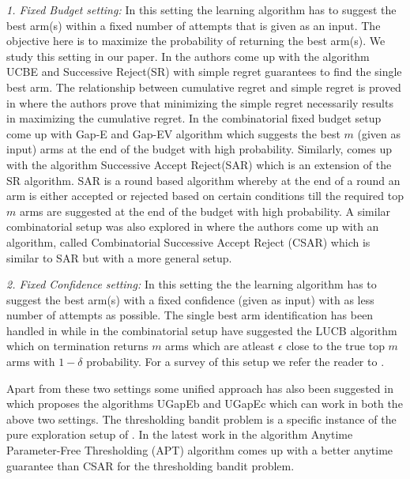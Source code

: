 	\emph{1. Fixed Budget setting:} In this setting the learning algorithm has to suggest the best arm(s) within a fixed number of attempts that is given as an input. The objective here is to maximize the probability of returning the best arm(s).  We study this setting in our paper. In \cite{audibert2010best} the authors come up with the algorithm UCBE and Successive Reject(SR) with simple regret guarantees to find the single best arm. The relationship between cumulative regret and simple regret is proved in \cite{bubeck2011pure} where the authors prove that minimizing the simple regret necessarily results in maximizing the cumulative regret. In the combinatorial fixed budget setup \cite{gabillon2011multi} come up with Gap-E and Gap-EV algorithm which suggests the best $m$ (given as input) arms at the end of the budget with high probability. Similarly, \cite{bubeck2013multiple} comes up with the algorithm Successive Accept Reject(SAR) which is an extension of the SR algorithm. SAR is a round based algorithm whereby at the end of a round an arm is either accepted or rejected based on certain conditions till the required top $m$ arms are suggested at the end of the budget with high probability. A similar combinatorial setup was also explored in \cite{chen2014combinatorial} where the authors come up with an algorithm, called Combinatorial Successive Accept Reject (CSAR) which is similar to SAR but with a more general setup. 

	\emph{2. Fixed Confidence setting:} In this setting the the learning algorithm has to suggest the best arm(s) with a fixed confidence (given as input) with as less number of attempts as possible. The single best arm identification has been handled in \cite{even2006action} while in the combinatorial setup \cite{kalyanakrishnan2012pac} have suggested the LUCB algorithm which on termination returns $m$ arms which are atleast $\epsilon$ close to the true top $m$ arms with $1-\delta$ probability. For a survey of this setup we refer the reader to \cite{jamieson2014best}. 

	Apart from these two settings some unified approach has also been suggested in \cite{gabillon2012best} which proposes the algorithms UGapEb and UGapEc which can work in both the above two settings. The thresholding bandit problem is a specific instance of the pure exploration setup of \cite{chen2014combinatorial}. In the latest work in \cite{locatelli2016optimal} the algorithm Anytime Parameter-Free Thresholding (APT) algorithm comes up with a better anytime guarantee than CSAR for the thresholding bandit problem.	
	
